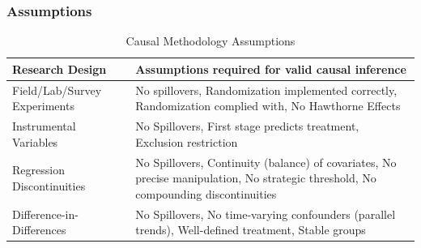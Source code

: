 \documentclass[xcolor=x11names,compress]{beamer}\usepackage[]{graphicx}\usepackage[]{color}
\renewcommand{\(}{\begin{columns}}
\renewcommand{\)}{\end{columns}}
\newcommand{\<}[1]{\begin{column}{#1}}
\renewcommand{\>}{\end{column}}
\begin{document}
\begin{frame}
\frametitle{Assumptions}
\footnotesize
\begin{table}[htbp]
  \centering
  \caption{Causal Methodology Assumptions}
    \begin{tabular}{|p{3cm}|p{6cm}|}
    \hline
    \textbf{Research Design} & \textbf{Assumptions required for valid causal inference} \bigstrut\\
    \hline
    Field/Lab/Survey Experiments & No spillovers, Randomization implemented correctly, Randomization complied with, No Hawthorne Effects \bigstrut\\
    \hline
    Instrumental Variables & No Spillovers, First stage predicts treatment, Exclusion restriction \bigstrut\\
    \hline
    Regression Discontinuities & No Spillovers, Continuity (balance) of covariates, No precise manipulation, No strategic threshold, No compounding discontinuities \bigstrut\\
    \hline
    Difference-in-Differences & No Spillovers, No time-varying confounders (parallel trends), Well-defined treatment, Stable groups \bigstrut\\
    \hline
    \end{tabular}%
  \label{tab:addlabel}%
\end{table}%
\normalsize
\end{frame}
\end{document}
